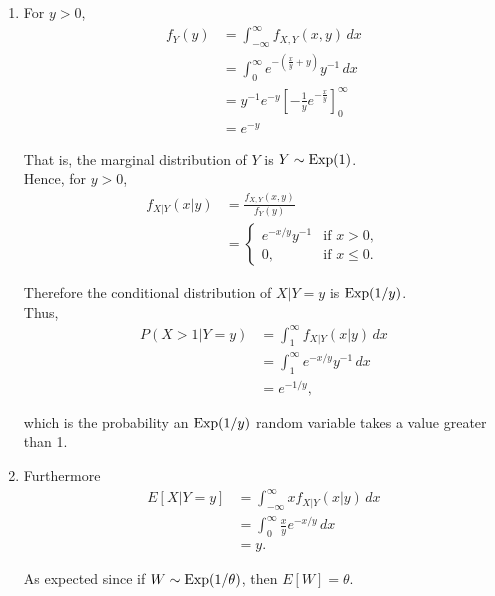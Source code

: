 \documentclass[
]{book}
\providecommand{\tightlist}{%
  \setlength{\itemsep}{0pt}\setlength{\parskip}{0pt}}
\begin{document}
\hypertarget{cond_example_sol}{}
\begin{enumerate}
\def\labelenumi{(\alph{enumi})}
\tightlist
\item
  For \(y>0\),\\

  \begin{align*}
  f_Y(y) &= \int_{-\infty}^\infty f_{X,Y}(x,y) \,dx \\
  &= \int_0^\infty e^{-(\frac{x}{y}+y)}y^{-1} \,dx \\ 
  &= y^{-1} e^{-y} \left[ -\frac{1}{y} e^{-\frac{x}{y}} \right]_0^\infty \\ 
  &= e^{-y}
  \end{align*}

  That is, the marginal distribution of \(Y\) is \(Y \sim {\rm Exp} (1)\).\\
  Hence, for \(y>0\),\\

  \begin{align*}
  f_{X|Y}(x|y) &= \frac{f_{X,Y}(x,y)}{f_Y(y)} \\
  &= \begin{cases} e^{-x/y}y^{-1} & \text{if } x>0,\\ 0, & \text{if } x \leq 0. \end{cases}
  \end{align*}

  Therefore the conditional distribution of \(X|Y=y\) is \({\rm Exp} (1/y)\).\\
  Thus,\\

  \begin{align*}
  P(X>1|Y=y) &= \int_1^\infty f_{X|Y}(x|y) \,dx \\
  &= \int_1^\infty e^{-x/y}y^{-1} \,dx \\
  &= e^{-1/y},
  \end{align*}

  which is the probability an \({\rm Exp} (1/y)\) random variable takes a value greater than 1.\\
\item
  Furthermore\\

  \begin{align*}
  E[X|Y=y] &= \int_{-\infty}^\infty x f_{X|Y}(x|y) \,dx \\  
  &= \int_0^\infty\frac{x}{y}e^{-x/y} \,dx \\  
  &=y.  
  \end{align*}

  As expected since if \(W \sim {\rm Exp} (1/\theta)\), then \(E[W] = \theta\).\\
\end{enumerate}
\end{document}
